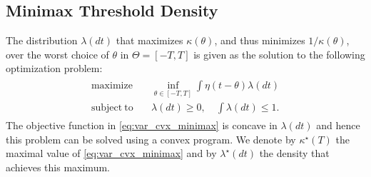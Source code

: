 \documentclass[letterpaper, 11pt]{IEEEtran}      %
\newtheorem{rem}{\bf {Remark}}
\begin{document}
\subsection{Minimax Threshold Density}
The distribution $\lambda(dt)$ that maximizes $\kappa(\theta)$, and thus minimizes $1/\kappa(\theta)$, over the worst choice of $\theta$ in $\Theta = [-T,T]$ is given as the solution to the following optimization problem:
\begin{align}
\label{eq:var_cvx_minimax}
\begin{split}
\mathrm{maximize} \quad &  \inf_{\theta \in [-T,T]} \int \eta(t-\theta) \lambda(dt)
\\ 
\mathrm{subject~to} 
\quad & \lambda(dt)\geq 0,\quad \int \lambda(dt) \leq 1. 
\end{split}
\end{align}
The objective function in \eqref{eq:var_cvx_minimax} is concave in $\lambda(dt)$ and hence this problem can be solved using a convex program. We denote by $\kappa^\star(T)$ the maximal value of \eqref{eq:var_cvx_minimax} and by $\lambda^\star(dt)$ the density that achieves this maximum.  
%
\end{document}
